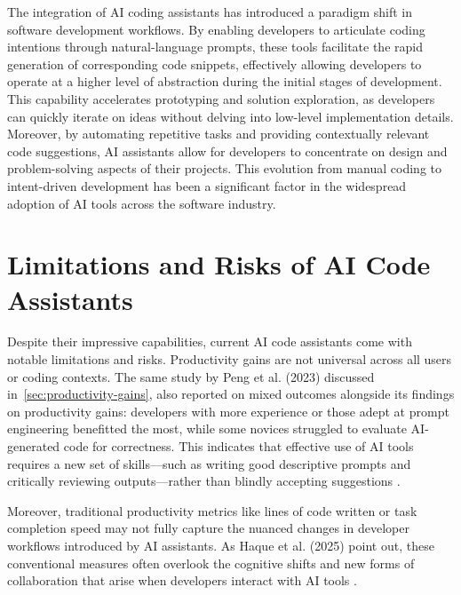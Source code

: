 The integration of \gls{AI} coding assistants has introduced a paradigm shift in software development workflows. By enabling developers to articulate coding intentions through natural-language prompts, these tools facilitate the rapid generation of corresponding code snippets, effectively allowing developers to operate at a higher level of abstraction during the initial stages of development. This capability accelerates prototyping and solution exploration, as developers can quickly iterate on ideas without delving into low-level implementation details. Moreover, by automating repetitive tasks and providing contextually relevant code suggestions, \gls{AI} assistants allow for developers to concentrate on design and problem-solving aspects of their projects. This evolution from manual coding to intent-driven development has been a significant factor in the widespread adoption of AI tools across the software industry.

\section{Limitations and Risks of AI Code Assistants}
\label{sec:ai-limitations}
Despite their impressive capabilities, current \gls{AI} code assistants come with notable limitations and risks. Productivity gains are not universal across all users or coding contexts. The same study by Peng et al. (2023) discussed in~\ref{sec:productivity-gains}, also reported on mixed outcomes alongside its findings on productivity gains: developers with more experience or those adept at prompt engineering benefitted the most, while some novices struggled to evaluate \gls{AI}-generated code for correctness. This indicates that effective use of \gls{AI} tools requires a new set of skills—such as writing good descriptive prompts and critically reviewing outputs—rather than blindly accepting suggestions \autocite{Peng2023}.

Moreover, traditional productivity metrics like lines of code written or task completion speed may not fully capture the nuanced changes in developer workflows introduced by AI assistants. As Haque et al. (2025) point out, these conventional measures often overlook the cognitive shifts and new forms of collaboration that arise when developers interact with AI tools \autocite{Haque2025}.

